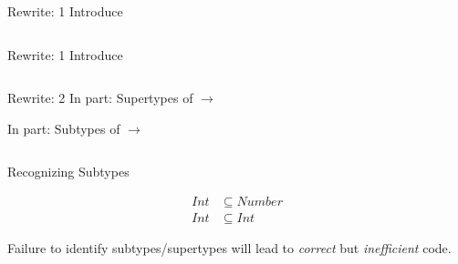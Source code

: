 \begin{frame}{Rewrite: 1}
  Introduce \colorbox{pink!30}{}

  \begin{columns}
    \begin{column}{0.5\textwidth}
      \usebox\typecaseAbox
    \end{column}
    \begin{column}{0.5\textwidth}  %
      \usebox\typecaseBabox
    \end{column}    
  \end{columns}
\end{frame}

\begin{frame}{Rewrite: 1}
  Introduce \colorbox{pink!30}{}

  \begin{columns}
    \begin{column}{0.5\textwidth}
      \usebox\typecaseAbox
    \end{column}
    \begin{column}{0.5\textwidth}  %
      \usebox\typecaseBbox
    \end{column}    
  \end{columns}
\end{frame}




\begin{frame}{Rewrite: 2}
  In  part: \colorbox{pink!30}{Supertypes of  $\to$  }
  
  In  part: \colorbox{pink!30}{Subtypes of  $\to$ }

  \begin{columns}
    \begin{column}{0.5\textwidth}
      \usebox\typecaseBbox
    \end{column}
    \begin{column}{0.5\textwidth}  %
      \usebox\typecaseChbox
    \end{column}    
  \end{columns}
\end{frame}


\begin{frame}{Recognizing Subtypes}
  \centering

  \begin{align*}
    Int&\subseteq Number\\
    Int&\subseteq Int
  \end{align*}

  \scalebox{0.8}{}


  Failure to identify subtypes/supertypes will lead to \emph{correct} but \emph{inefficient} code.
\end{frame}




